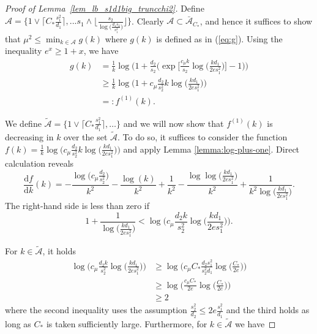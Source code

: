\documentclass{article}
\newcommand{\D}{\textrm{d}}
\newcommand{\cA}{\mathcal{A}}
\newcommand{\Ct}{C_{*}}
\newcommand{\ju}[1]{{\color{purple}Julien: #1}}
\newcommand{\pa}[1]{{\color{red}Parker: #1}}
\theoremstyle{remark}
\begin{document}
\begin{proof}[Proof of Lemma~\ref{lem_lb_s1d1big_truncchi2}]
    Define $\cA = \{ 1 \vee \lceil\Ct \frac{s_1^2}{d_1} \rceil, ...s_1 \wedge \big\lfloor\frac{s_2}{\log\big(\frac{d_1s_2}{s_1^2}\big)} \big\rfloor \}$. Clearly $\cA \subset \bar{\cA}_{\Ct}$, and hence it suffices to show that $\mu^2 \leq \min_{k \in \cA}g(k)$ where $g(k)$ is defined as in (\ref{eq:g}). Using the inequality $e^x \geq 1 + x $, we have 
    \begin{align*}
        g(k) &= \frac{1}{k}\log\Bigg(1 + \frac{d_2}{s_2}\bigg(\exp\Big[\frac{c_\mu k}{s_2}\log\big(\frac{kd_1}{2es_1^2}\big)\Big] - 1\bigg)\Bigg) \\
        &\geq \frac{1}{k}\log\Bigg(1 + c_\mu\frac{d_2}{s^2_2}k\log\Big(\frac{kd_1}{2es_1^2}\Big)\Bigg) \\
        &=: f^{(1)}(k).
    \end{align*}
    
% 
%   
    We define $\widetilde{\mathcal{A}} = \{ 1 \vee \lceil\Ct \frac{s_1^2}{d_1} \rceil, \dots \}$ and we will now show that $f^{(1)}(k)$ is decreasing in $k$ over the set $\widetilde{\mathcal{A}}$. To do so, it suffices to consider the function $f(k) = \frac{1}{k}\log\Big(c_\mu\frac{d_2}{s^2_2}k\log\big(\frac{kd_1}{2es_1^2}\big)\Big)$ and apply Lemma \ref{lemma:log-plus-one}. Direct calculation reveals
    \[\frac{\D f}{\D k}(k) = -\frac{\log\big(c_\mu\frac{d_2}{s_2^2}\big)}{k^2} - \frac{\log(k)}{k^2} + \frac{1}{k^2} - \frac{\log \log \big(\frac{kd_1}{2es_1^2}\big)}{k^2} + \frac{1}{k^2\log\big(\frac{kd_1}{2es_1^2}\big)}.\]
    The right-hand side is less than zero if   
    \[1 + \frac{1}{\log\big(\frac{kd_1}{2es_1^2}\big)} < \log\Big(c_\mu\frac{d_2k}{s_2^2} \log \big(\frac{kd_1}{2es_1^2}\big)\Big).\]
    
    For $k \in \widetilde{\mathcal{A}}$, it holds 
    \begin{align*}
        \log\Big(c_\mu\frac{d_2k}{s_2^2}\log \big(\frac{kd_1}{2es_1^2}\big)\Big) 
        &\geq \log\Big(c_\mu \Ct \frac{d_2s_1^2}{s_2^2d_1}\log \big(\frac{\Ct}{2e}\big)\Big) \\
        &\geq \log\Big(\frac{c_\mu C_*}{2e} \log \big(\frac{\Ct}{2e}\big)\Big)\\
        &\geq 2
    \end{align*}
    where the second inequality uses the assumption $\frac{s_2^2}{d_2} \leq 2e\frac{s_1^2}{d_1}$ and the third holds as long as $\Ct$ is taken sufficiently large. Furthermore, for $k \in \widetilde{\mathcal{A}}$ we have 


\end{proof}
\end{document}
